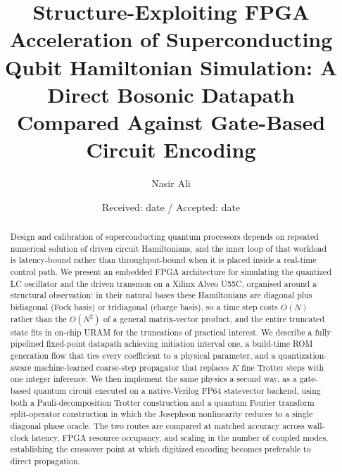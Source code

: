 \documentclass[smallextended]{svjour3}
\begin{document}
\title{Structure-Exploiting FPGA Acceleration of Superconducting Qubit Hamiltonian
Simulation: A Direct Bosonic Datapath Compared Against Gate-Based Circuit Encoding}

\author{Nasir Ali}


\date{Received: date / Accepted: date}

\maketitle

\begin{abstract}
Design and calibration of superconducting quantum processors depends on repeated
numerical solution of driven circuit Hamiltonians, and the inner loop of that workload
is latency-bound rather than throughput-bound when it is placed inside a real-time
control path. We present an embedded FPGA architecture for simulating the quantized
LC oscillator and the driven transmon on a Xilinx Alveo U55C, organised around a
structural observation: in their natural bases these Hamiltonians are diagonal plus
bidiagonal (Fock basis) or tridiagonal (charge basis), so a time step costs $O(N)$
rather than the $O(N^2)$ of a general matrix-vector product, and the entire truncated
state fits in on-chip URAM for the truncations of practical interest. We describe a
fully pipelined fixed-point datapath achieving initiation interval one, a build-time
ROM generation flow that ties every coefficient to a physical parameter, and a
quantization-aware machine-learned coarse-step propagator that replaces $K$ fine
Trotter steps with one integer inference. We then implement the same physics a second
way, as a gate-based quantum circuit executed on a native-Verilog FP64 statevector
backend, using both a Pauli-decomposition Trotter construction and a quantum Fourier
transform split-operator construction in which the Josephson nonlinearity reduces to a
single diagonal phase oracle. The two routes are compared at matched accuracy across
wall-clock latency, FPGA resource occupancy, and scaling in the number of coupled
modes, establishing the crossover point at which digitized encoding becomes preferable
to direct propagation.
\end{abstract}
\end{document}
